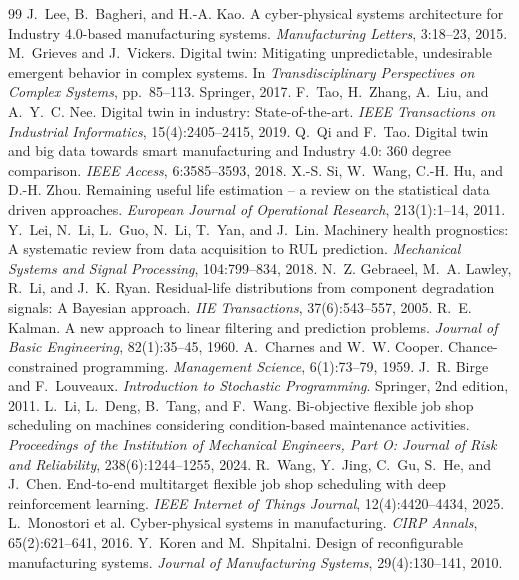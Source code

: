 \documentclass[10pt,a4paper]{article}
\begin{document}
\begin{thebibliography}{99}
 J.~Lee, B.~Bagheri, and H.-A. Kao. A cyber-physical systems architecture for Industry 4.0-based manufacturing systems. \emph{Manufacturing Letters}, 3:18--23, 2015.
 M.~Grieves and J.~Vickers. Digital twin: Mitigating unpredictable, undesirable emergent behavior in complex systems. In \emph{Transdisciplinary Perspectives on Complex Systems}, pp.~85--113. Springer, 2017.
 F.~Tao, H.~Zhang, A.~Liu, and A.~Y.~C. Nee. Digital twin in industry: State-of-the-art. \emph{IEEE Transactions on Industrial Informatics}, 15(4):2405--2415, 2019.
 Q.~Qi and F.~Tao. Digital twin and big data towards smart manufacturing and Industry 4.0: 360 degree comparison. \emph{IEEE Access}, 6:3585--3593, 2018.
 X.-S. Si, W.~Wang, C.-H. Hu, and D.-H. Zhou. Remaining useful life estimation -- a review on the statistical data driven approaches. \emph{European Journal of Operational Research}, 213(1):1--14, 2011.
 Y.~Lei, N.~Li, L.~Guo, N.~Li, T.~Yan, and J.~Lin. Machinery health prognostics: A systematic review from data acquisition to RUL prediction. \emph{Mechanical Systems and Signal Processing}, 104:799--834, 2018.
 N.~Z. Gebraeel, M.~A. Lawley, R.~Li, and J.~K. Ryan. Residual-life distributions from component degradation signals: A Bayesian approach. \emph{IIE Transactions}, 37(6):543--557, 2005.
 R.~E. Kalman. A new approach to linear filtering and prediction problems. \emph{Journal of Basic Engineering}, 82(1):35--45, 1960.
 A.~Charnes and W.~W. Cooper. Chance-constrained programming. \emph{Management Science}, 6(1):73--79, 1959.
 J.~R. Birge and F.~Louveaux. \emph{Introduction to Stochastic Programming}. Springer, 2nd edition, 2011.
 L.~Li, L.~Deng, B.~Tang, and F.~Wang. Bi-objective flexible job shop scheduling on machines considering condition-based maintenance activities. \emph{Proceedings of the Institution of Mechanical Engineers, Part O: Journal of Risk and Reliability}, 238(6):1244--1255, 2024.
 R.~Wang, Y.~Jing, C.~Gu, S.~He, and J.~Chen. End-to-end multitarget flexible job shop scheduling with deep reinforcement learning. \emph{IEEE Internet of Things Journal}, 12(4):4420--4434, 2025.
 L.~Monostori et al. Cyber-physical systems in manufacturing. \emph{CIRP Annals}, 65(2):621--641, 2016.
 Y.~Koren and M.~Shpitalni. Design of reconfigurable manufacturing systems. \emph{Journal of Manufacturing Systems}, 29(4):130--141, 2010.
\end{thebibliography}
\end{document}
